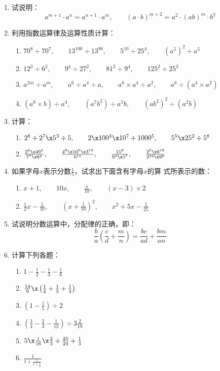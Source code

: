 \begin{enumerate}
	\item 试说明： $$a^{m+1} \cdot a^{n}=a^{n+1} \cdot a^{m},\qquad 
	(a \cdot b)^{m+2}=a^{2} \cdot(a b)^{m} \cdot b^{2}
	$$
	\item 
	利用指数运算律及运算性质计算：
	\begin{enumerate}
		\item $70^{8}\div 70^{7},\qquad 13^{100}\div 13^{98},\qquad 5^{10}\div 25^{4}, \qquad \left(a^{5}\right)^{2}\div a^{5}$
		\item $12^{3}\div 6^{2},\qquad 9^{4}\div 27^{2} ,\qquad 81^{2}\div 9^{4} ,\qquad 125^{2}\div 25^{2}$
		\item $a^{2 m} \div a^{m},\qquad a^{6}\div a^{4} \div a ,\qquad a^{6} \times a^{4} \div a^{2},\qquad a^{6}\div\left(a^{4} \times a^{2}\right)$
		\item $\left(a^{6} \times b\right)\div a^{4},\qquad \left(a^{7} b^{2}\right)\div a^{5} b ,\qquad \left(a b^{2}\right)^{2}\div \left(a^{2} b\right)$
	\end{enumerate}
	
	\item 计算：
	\begin{enumerate}
		\item $2^8\div 2^7\x 5^3\div 5,\qquad 2\x 100^4\x 10^7\div 1000^5,\qquad 5^5\x 25^2\div 5^8$
		\item $\frac{2^6\x 49^4}{7^7\x 8^2},\qquad \frac{4^8\x 10^0\x 3^{10}}{6^{10}},\qquad \frac{15^8}{9^4\x 5^7},\qquad \frac{2^5\x 6^{18}}{2^{22}\x 9^9}$
	\end{enumerate}
	
	\item 如果字母$x$表示分数$\frac{1}{5}$，试求出下面含有字母$x$的算
	式所表示的数：
	\begin{enumerate}
		\item $x+1,\qquad 10x,\qquad \frac{x}{10},\qquad (x-3)\times 2$
		\item $\frac{1}{2}x-\frac{1}{10},\qquad \left(x+\frac{1}{10}\right)^2,\qquad x^2+5x-\frac{1}{25}$
	\end{enumerate}
	
	\item 试说明分数运算中，分配律的正确，即：
	\[\frac{b}{a}\left(\frac{c}{d}+\frac{m}{n}\right)=\frac{bc}{ad}+\frac{bm}{an} \]
	
	\item 计算下列各题：
	\begin{multicols}{2}
		\begin{enumerate}
			\item $1-\frac{1}{2}-\frac{1}{3}-\frac{1}{6}$
			\item $\frac{14}{9}\x\left(\frac{1}{2}+\frac{1}{3}+\frac{1}{4}\right)$
			\item $\left(1-\frac{1}{5}\right)\div 2$
			\item $\left(\frac{3}{4}-\frac{2}{3}-\frac{1}{12}\right)\div 3\frac{2}{19}$
			\item $5\x \frac{1}{16}\x \frac{2}{3}\div \frac{25}{24}+\frac{1}{3}$
			\item $\frac{1}{1+\frac{1}{1+\frac{1}{2}}}$
		\end{enumerate}
	\end{multicols}
	

\end{enumerate}
